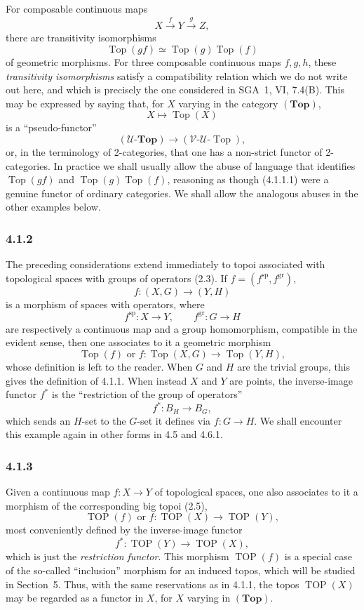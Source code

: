 \documentclass[11pt]{article}
\newcommand{\U}{\mathcal{U}}
\newcommand{\V}{\mathcal{V}}
\newcommand{\Esp}{\mathbf{Top}}
\newcommand{\Top}{\operatorname{Top}}
\newcommand{\TOP}{\operatorname{TOP}}
\begin{document}
For composable continuous maps
\[
X\xrightarrow{f}Y\xrightarrow{g}Z,
\]
there are transitivity isomorphisms
\[
\Top(gf)\simeq \Top(g)\Top(f)
\]
of geometric morphisms. For three composable continuous maps \(f,g,h\), these \emph{transitivity isomorphisms} satisfy a compatibility relation which we do not write out here, and which is precisely the one considered in SGA~1, VI, 7.4(B). This may be expressed by saying that, for \(X\) varying in the category \((\Esp)\),
\[
X\longmapsto \Top(X)
\]
is a ``pseudo-functor''
\[
(\U\text{-}\Esp)\longrightarrow(\V\text{-}\U\text{-}\Top),\tag{4.1.1.1}
\]
or, in the terminology of 2-categories, that one has a non-strict functor of 2-categories. In practice we shall usually allow the abuse of language that identifies \(\Top(gf)\) and \(\Top(g)\Top(f)\), reasoning as though (4.1.1.1) were a genuine functor of ordinary categories. We shall allow the analogous abuses in the other examples below.

\subsubsection*{4.1.2}
The preceding considerations extend immediately to topoi associated with topological spaces with groups of operators (2.3). If \(f=(f^{\mathrm{sp}},f^{\mathrm{gr}})\),
\[
f:(X,G)\longrightarrow(Y,H)
\]
is a morphism of spaces with operators, where
\[
f^{\mathrm{sp}}:X\to Y,
\qquad
f^{\mathrm{gr}}:G\to H
\]
are respectively a continuous map and a group homomorphism, compatible in the evident sense, then one associates to it a geometric morphism
\[
\Top(f)\text{ or }f:\Top(X,G)\longrightarrow\Top(Y,H),
\]
whose definition is left to the reader. When \(G\) and \(H\) are the trivial groups, this gives the definition of 4.1.1. When instead \(X\) and \(Y\) are points, the inverse-image functor \(f^\ast\) is the ``restriction of the group of operators''
\[
f^\ast:B_H\longrightarrow B_G,
\]
which sends an \(H\)-set to the \(G\)-set it defines via \(f:G\to H\). We shall encounter this example again in other forms in 4.5 and 4.6.1.

\subsubsection*{4.1.3}
Given a continuous map \(f:X\to Y\) of topological spaces, one also associates to it a morphism of the corresponding big topoi (2.5),
\[
\TOP(f)\text{ or }f:\TOP(X)\longrightarrow\TOP(Y),
\]
most conveniently defined by the inverse-image functor
\[
f^\ast:\TOP(Y)\longrightarrow\TOP(X),
\]
which is just the \emph{restriction functor}. This morphism \(\TOP(f)\) is a special case of the so-called ``inclusion'' morphism for an induced topos, which will be studied in Section~5. Thus, with the same reservations as in 4.1.1, the topos \(\TOP(X)\) may be regarded as a functor in \(X\), for \(X\) varying in \((\Esp)\).
\end{document}
